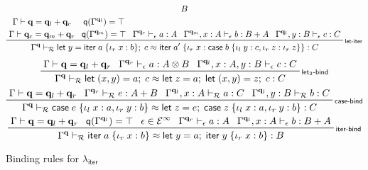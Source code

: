 \documentclass[acmsmall,screen,review]{acmart}
\newcommand{\mc}[1]{\ensuremath{\mathcal{#1}}}
\newcommand{\mb}[1]{\ensuremath{\mathbf{#1}}}
\newcommand{\ms}[1]{\ensuremath{\mathsf{#1}}}
\newcommand{\lto}{:}
\newcommand{\linl}[1]{\iota_l\;{#1}}
\newcommand{\linr}[1]{\iota_r\;{#1}}
\newcommand{\letexpr}[3]{\ensuremath{\ms{let}\;#1 = #2;\;#3}}
\newcommand{\caseexpr}[5]{\ms{case}\;#1\;\{\linl{#2} \lto #3, \linr{#4} \lto #5\}}
\newcommand{\liter}[3]{\ms{iter}\;#1\;\{ \linr{#2} \lto #3 \}}
\newcommand{\einf}[1]{#1 \in \mc{E}^\infty}
\newcommand{\qsp}[4]{#1 \vdash #2 = #3 + #4}
\newcommand{\rle}[1]{{\scriptsize\textsf{#1}}}
\newcommand{\hasty}[4]{#1 \vdash_{#2} #3: {#4}}
\newcommand{\teqv}{\approx}
\newcommand{\tmeq}[5]{#1 \vdash_{#2} #3 \teqv #4 : {#5}}
\newcommand{\subiterssa}{\(\lambda_{\ms{iter}}\)}
\newcommand{\alquant}{\ms{q}}
\begin{document}
\begin{figure}
\begin{gather*}
{        {B}
      } 
      \\
    \prftree[r]{\rle{let-iter}}
      {
      \prfStackPremises
      {\qsp{\Gamma}{\mb{q}}{\mb{q}_l}{\mb{q}_c}}
      {\qsp{\Gamma}{\mb{q}_c}{\mb{q}_m}{\mb{q}_r}}
      }
      {
      \prfStackPremises
      {\alquant(\Gamma^{\mb{q}_l}) = \top}
      {\alquant(\Gamma^{\mb{q}_m}) = \top}
      }
      {\hasty{\Gamma^{\mb{q}_r}}{\epsilon}{a}{A}}
      {\hasty{\Gamma^{\mb{q}_m}, x : A}{\epsilon}{b}{B + A}}
      {\hasty{\Gamma^{\mb{q}_l}, y : B}{\epsilon}{c}{C}}
      {\tmeq{\Gamma^{\mb{q}}}{\mc{R}}
        {\letexpr{y}{\liter{a}{x}{b}}{c}}
        {\liter{a'}{x}{\caseexpr{b}{y}{c}{z}{\linr{z}}}}
        {C}
      }
  \end{gather*}
  \begin{gather*}
    \prftree[r]{\rle{let$_2$-bind}}
      {\qsp{\Gamma}{\mb{q}}{\mb{q}_l}{\mb{q}_r}}
      {\hasty{\Gamma^{\mb{q}_r}}{\epsilon}{a}{A \otimes B}}
      {\hasty{\Gamma^{\mb{q}_l}, x : A, y : B}{\epsilon}{c}{C}}
      {
        \tmeq{\Gamma^{\mb{q}}}{\mc{R}}
          {\letexpr{(x, y)}{a}{c}}
          {\letexpr{z}{a}{\letexpr{(x, y)}{z}{c}}}
          {C}
      } \\
    \prftree[r]{\rle{case-bind}}
      {\qsp{\Gamma}{\mb{q}}{\mb{q}_l}{\mb{q}_r}}
      {\hasty{\Gamma^{\mb{q}_r}}{\mc{R}}{e}{A + B}}
      {\hasty{\Gamma^{\mb{q}_l}, x : A}{\mc{R}}{a}{C}}
      {\hasty{\Gamma^{\mb{q}_l}, y : B}{\mc{R}}{b}{C}}
      {
        \tmeq{\Gamma^{\mb{q}}}{\mc{R}}
        {\caseexpr{e}{x}{a}{y}{b}}
        {\letexpr{z}{e}{\caseexpr{z}{x}{a}{y}{b}}}
        {C}
      } \\
    \prftree[r]{\rle{iter-bind}}
      {\qsp{\Gamma}{\mb{q}}{\mb{q}_l}{\mb{q}_r}}
      {\alquant(\Gamma^{\mb{q}_l}) = \top}
      {\einf{\epsilon}}
      {\hasty{\Gamma^{\mb{q}_r}}{\epsilon}{a}{A}}
      {\hasty{\Gamma^{\mb{q}_l}, x : A}{\epsilon}{b}{B + A}}
      {\tmeq{\Gamma^{\mb{q}}}{\mc{R}}{\liter{a}{x}{b}}{\letexpr{y}{a}{\liter{y}{x}{b}}}{B}}
  \end{gather*}
  \caption{Binding rules for \subiterssa{}}
  \Description{}
  \label{fig:binding-rules}
\end{figure}

\end{document}
